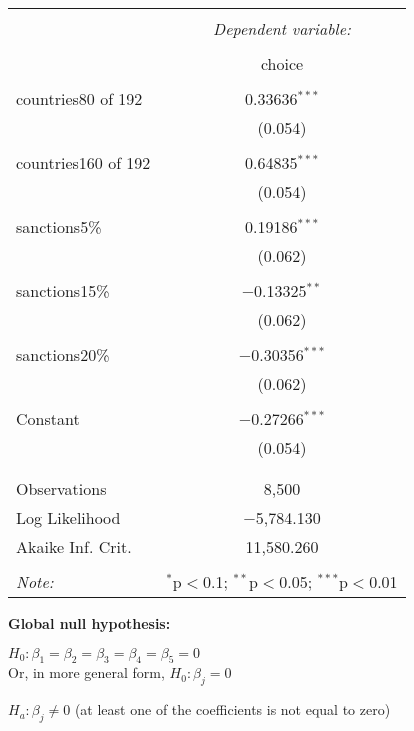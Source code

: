 \documentclass[12pt,letterpaper]{article}
\begin{document}
\begin{enumerate}
\begin{enumerate}
	\begin{table}[H] \centering   \caption{}   \label{} \begin{tabular}{@{\extracolsep{5pt}}lc} \\[-1.8ex]\hline \hline \\[-1.8ex]  & \multicolumn{1}{c}{\textit{Dependent variable:}} \\ \cline{2-2} \\[-1.8ex] & choice \\ \hline \\[-1.8ex]  countries80 of 192 & 0.33636$^{***}$ \\   & (0.054) \\   & \\  countries160 of 192 & 0.64835$^{***}$ \\   & (0.054) \\   & \\  sanctions5\% & 0.19186$^{***}$ \\   & (0.062) \\   & \\  sanctions15\% & $-$0.13325$^{**}$ \\   & (0.062) \\   & \\  sanctions20\% & $-$0.30356$^{***}$ \\   & (0.062) \\   & \\  Constant & $-$0.27266$^{***}$ \\   & (0.054) \\   & \\ \hline \\[-1.8ex] Observations & 8,500 \\ Log Likelihood & $-$5,784.130 \\ Akaike Inf. Crit. & 11,580.260 \\ \hline \hline \\[-1.8ex] \textit{Note:}  & \multicolumn{1}{r}{$^{*}$p$<$0.1; $^{**}$p$<$0.05; $^{***}$p$<$0.01} \\ \end{tabular} \end{table} 

\vspace{.25cm}
\textbf{Global null hypothesis:}

$H_0: \beta_1 = \beta_2 = \beta_3 = \beta_4 = \beta_5 = 0$ \\
Or, in more general form, $H_0: \beta_j  = 0$

$H_a: \beta_j \neq 0$ (at least one of the coefficients is not equal to zero)


\end{enumerate}
\end{enumerate}
\end{document}
